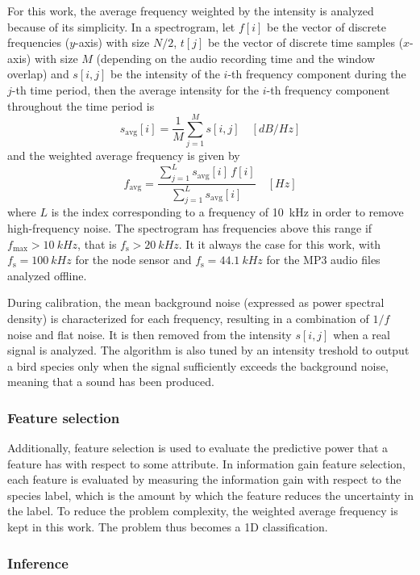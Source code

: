 \documentclass{EPL-master-thesis-covers-EN}
\newcommand{\te}[1]{\textrm{#1}}
\begin{document}
For this work, the average frequency weighted by the intensity is analyzed because of its simplicity. In a spectrogram, let $f[i]$ be the vector of discrete frequencies ($y$-axis) with size $N/2$, $t[j]$ be the vector of discrete time samples ($x$-axis) with size $M$ (depending on the audio recording time and the window overlap) and $s[i,j]$ be the intensity of the $i$-th frequency component during the $j$-th time period, then the average intensity for the $i$-th frequency component throughout the time period is
\[
 s_\te{avg}[i] = \frac{1}{M} \sum_{j=1}^{M} s[i,j] \quad [\si{dB/Hz}]
\]
and the weighted average frequency is given by
\[
 f_\te{avg} = \frac{\sum_{j=1}^{L} s_\te{avg}[i] \, f[i]}{\sum_{j=1}^{L} s_\te{avg}[i]} \quad [\si{Hz}]
\]
where $L$ is the index corresponding to a frequency of \SI{10}{kHz} in order to remove high-frequency noise. The spectrogram has frequencies above this range if $f_\te{max} > \SI{10}{kHz}$, that is $f_\te{s} > \SI{20}{kHz}$. It it always the case for this work, with $f_\te{s} = \SI{100}{kHz}$ for the node sensor and $f_\te{s} = \SI{44.1}{kHz}$ for the MP3 audio files analyzed offline.

During calibration, the mean background noise (expressed as power spectral density) is characterized for each frequency, resulting in a combination of $1/f$ noise and flat noise. It is then removed from the intensity $s[i,j]$ when a real signal is analyzed. The algorithm is also tuned by an intensity treshold to output a bird species only when the signal sufficiently exceeds the background noise, meaning that a sound has been produced.

\subsubsection*{Feature selection}

Additionally, feature selection is used to evaluate the predictive power that a feature has with respect to some attribute.
In information gain feature selection, each feature is evaluated by measuring the information gain with respect to the species label, which is the amount by which the feature reduces the uncertainty in the label. To reduce the problem complexity, the weighted average frequency is kept in this work. The problem thus becomes a 1D classification.

\subsubsection*{Inference}
\end{document}
